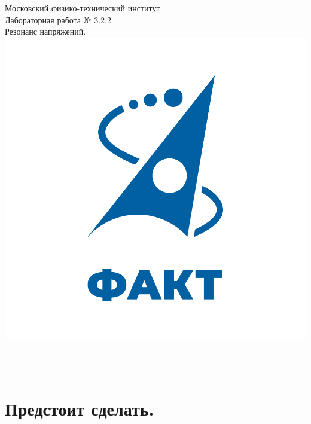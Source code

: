 \documentclass[a4paper,12pt]{article} %
\begin{document}

\begin{titlepage}
\begin{center}
	\large{Московский физико-технический институт}\\
	\vspace{100px}
	\LARGE{Лабораторная работа № 3.2.2}\\
	\LARGE{Резонанс напряжений.}\\
	\vspace{30px}
	\includegraphics[scale = 0.3]{fakt_logo.png}\\
\end{center}

\vfill
\begin{flushright}
	\\
	\\
\end{flushright}
\end{titlepage}

\newpage

\tableofcontents

\newpage

\newpage

\section{Предстоит сделать.}
\end{document}
